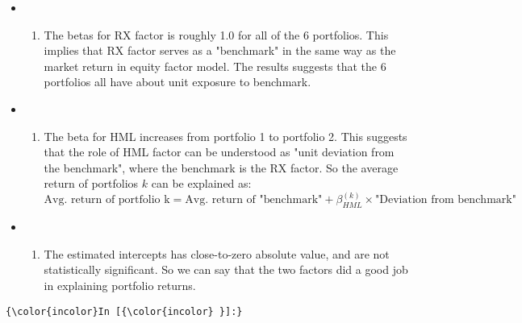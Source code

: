 \documentclass[11pt]{article}
\providecommand{\tightlist}{%
      \setlength{\itemsep}{0pt}\setlength{\parskip}{0pt}}
\begin{document}
\begin{itemize}
\item
  \begin{enumerate}
  \def\labelenumi{(\roman{enumi})}
  \tightlist
  \item
    The betas for RX factor is roughly 1.0 for all of the 6 portfolios.
    This implies that RX factor serves as a "benchmark" in the same way
    as the market return in equity factor model. The results suggests
    that the 6 portfolios all have about unit exposure to benchmark.
  \end{enumerate}
\item
  \begin{enumerate}
  \def\labelenumi{(\roman{enumi})}
  \setcounter{enumi}{1}
  \tightlist
  \item
    The beta for HML increases from portfolio 1 to portfolio 2. This
    suggests that the role of HML factor can be understood as "unit
    deviation from the benchmark", where the benchmark is the RX factor.
    So the average return of portfolios \(k\) can be explained as: \[
    \text{Avg. return of portfolio k} = \text{Avg. return of "benchmark"} + \beta_{HML}^{(k)} \times \text{"Deviation from benchmark"}
    \]
  \end{enumerate}
\item
  \begin{enumerate}
  \def\labelenumi{(\roman{enumi})}
  \setcounter{enumi}{2}
  \tightlist
  \item
    The estimated intercepts has close-to-zero absolute value, and are
    not statistically significant. So we can say that the two factors
    did a good job in explaining portfolio returns.
  \end{enumerate}
\end{itemize}

    \begin{Verbatim}[commandchars=\\\{\}]
{\color{incolor}In [{\color{incolor} }]:} 
\end{Verbatim}


    
    
    
    
\end{document}

